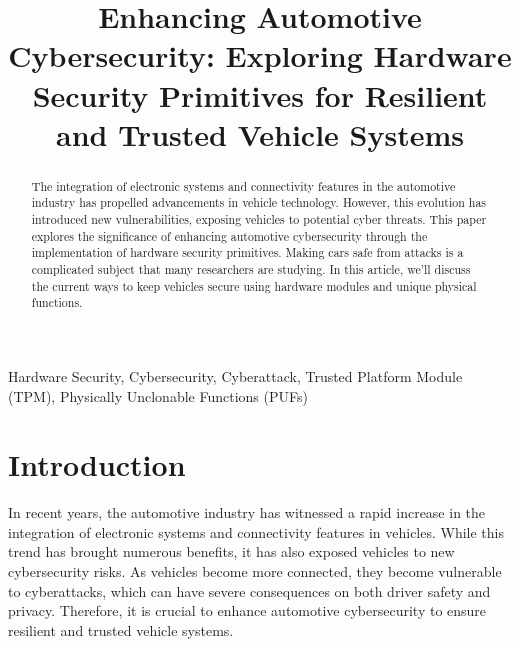 \documentclass[conference]{IEEEtran}
\begin{document}
\title{Enhancing Automotive Cybersecurity: Exploring Hardware Security Primitives for Resilient and Trusted Vehicle Systems }


\author{
\and
{}

}

\maketitle

\begin{abstract}
The integration of electronic systems and connectivity features in the automotive industry has propelled advancements in vehicle technology. However, this evolution has introduced new vulnerabilities, exposing vehicles to potential cyber threats. This paper explores the significance of enhancing automotive cybersecurity through the implementation of hardware security primitives. Making cars safe from attacks is a complicated subject that many researchers are studying. In this article, we'll discuss the current ways to keep vehicles secure using hardware modules and unique physical functions. 
\end{abstract}

\begin{IEEEkeywords}
Hardware Security, Cybersecurity, Cyberattack, Trusted Platform Module (TPM), Physically Unclonable Functions (PUFs)
\end{IEEEkeywords}

\section{Introduction}
In recent years, the automotive industry has witnessed a rapid increase in the integration of electronic systems and connectivity features in vehicles. While this trend has brought numerous benefits, it has also exposed vehicles to new cybersecurity risks. As vehicles become more connected, they become vulnerable to cyberattacks, which can have severe consequences on both driver safety and privacy. Therefore, it is crucial to enhance automotive cybersecurity to ensure resilient and trusted vehicle systems.
\end{document}
